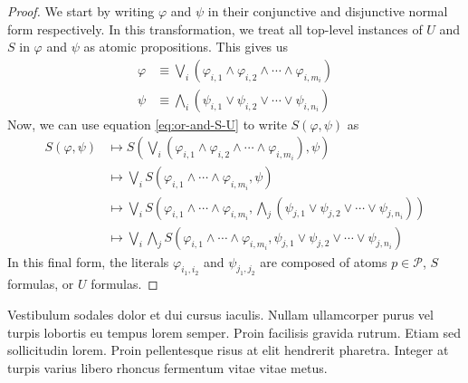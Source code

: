 \documentclass[a4paper,UKenglish,cleveref, autoref, thm-restate]{lipics-v2021}
\begin{document}
\begin{proof}
    We start by writing $\varphi$ and $\psi$ in their conjunctive and disjunctive normal form respectively. In this transformation, we treat all top-level instances of $U$ and $S$ in $\varphi$ and $\psi$ as atomic propositions. This gives us
    \begin{equation*}
        \begin{aligned}
            \varphi &\equiv \bigvee_i \left( \varphi_{i, 1} \land \varphi_{i, 2} \land \cdots \land \varphi_{i, m_i} \right)\\
            \psi &\equiv \bigwedge_i \left( \psi_{i, 1} \lor \psi_{i, 2} \lor \cdots \lor \psi_{i, n_i} \right)
        \end{aligned}
    \end{equation*}
    Now, we can use equation \ref{eq:or-and-S-U} to write $S(\varphi, \psi)$ as
    \begin{equation*}
        \begin{aligned}
            S(\varphi, \psi) &\longmapsto S\left(\bigvee_i (\varphi_{i, 1} \land \varphi_{i, 2} \land \cdots \land \varphi_{i, m_i}), \psi\right)\\
            &\longmapsto \bigvee_i S(\varphi_{i, 1} \land \cdots \land \varphi_{i, m_i}, \psi)\\
            &\longmapsto \bigvee_i S\left(\varphi_{i, 1} \land \cdots \land \varphi_{i, m_i}, \bigwedge_j \left( \psi_{j, 1} \lor \psi_{j, 2} \lor \cdots \lor \psi_{j, n_i} \right) \right)\\
            &\longmapsto \bigvee_i \bigwedge_j S\left(\varphi_{i, 1} \land \cdots \land \varphi_{i, m_i}, \psi_{j, 1} \lor \psi_{j, 2} \lor \cdots \lor \psi_{j, n_i} \right)
        \end{aligned}
    \end{equation*}
    In this final form, the literals $\varphi_{i_1, i_2}$ and $\psi_{j_1, j_2}$ are composed of atoms $p \in \mathcal{P}$, $S$ formulas, or $U$ formulas.
\end{proof}

\begin{lemma}
\label{lemma:lorem}
Vestibulum sodales dolor et dui cursus iaculis. Nullam ullamcorper purus vel turpis lobortis eu tempus lorem semper. Proin facilisis gravida rutrum. Etiam sed sollicitudin lorem. Proin pellentesque risus at elit hendrerit pharetra. Integer at turpis varius libero rhoncus fermentum vitae vitae metus.
\end{lemma}
\end{document}
